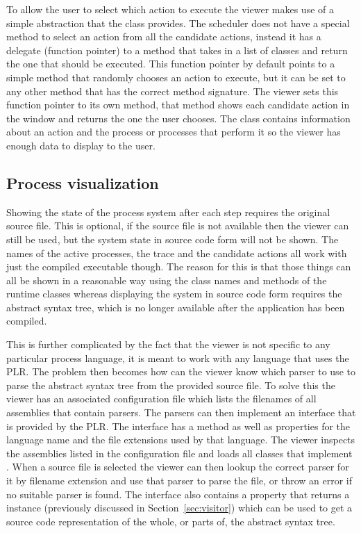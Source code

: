   To allow the user to select which action to execute the viewer makes use of
  a simple abstraction that the  class provides. The scheduler
  does not have a special method to select an action from all the candidate 
  actions, instead it has a delegate (function pointer) to a method that takes
  in a list of  classes and return the one that should be
  executed. This function pointer by default points to a simple method that 
  randomly chooses an action to execute, but it can be set to any other method
  that has the correct method signature. The viewer sets this function pointer
  to its own method, that method shows each candidate action in the window and
  returns the one the user chooses. The  class contains
  information about an action and the process or processes that perform it so
  the viewer has enough data to display to the user.

  \subsection{Process visualization}\label{sec:process_visualization}
	
	Showing the state of the process system after each step requires the original
	source file. This is optional, if the source file is not available then the
	viewer can still be used, but the system state in source code form will not
	be shown. The names of the active processes, the trace and the candidate 
	actions all work with just the compiled executable though. The reason for 
	this is that those things can all be shown in a reasonable way using the class 
	names and  methods of the runtime classes whereas displaying 
	the system in source code form  requires the abstract syntax tree, which is no 
	longer available after the application has been compiled. 
	
	This is further complicated by the fact that the viewer is not specific to any
	particular process language, it is meant to work with any language that uses
	the PLR. The problem then becomes how can the viewer know which parser to use
	to parse the abstract syntax tree from the provided source file. To solve this
	the viewer has an associated configuration file which lists the filenames of
	all assemblies that contain parsers. The parsers can then implement an 
	 interface that is provided by the PLR. The interface has a
	 method as well as properties for the language name and the file
	extensions used by that language. The viewer inspects the assemblies listed
	in the configuration file and loads all classes that implement .
	When a source file is selected the viewer can then lookup the correct parser
	for it by filename extension and use that parser to parse the file, or throw
	an error if no suitable parser is found. The  interface also 
	contains a property that returns a  instance (previously 
	discussed in Section~\ref{sec:visitor}) which can be used to get a source code 
	representation of the whole, or parts of, the abstract syntax tree.
	
